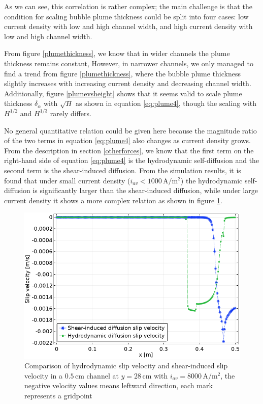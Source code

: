 As we can see, this correlation is rather complex; the main challenge is that the condition for scaling bubble plume thickness could be split into four cases: low current density with low and high channel width, and high current density with low and high channel width. 

From figure \ref{plumethickness}, we know that in wider channels the plume thickness remains constant, However, in narrower channels, we only managed to find a trend from figure \ref{plumethickness}, where the bubble plume thickness slightly increases with increasing current density and decreasing channel width. Additionally, figure \ref{plumevsheight} shows that it seems valid to scale plume thickness $\delta_{\alpha}$ with $\sqrt{H}$ as shown in equation \ref{eq:plume4}, though the scaling with $H^{1/2}$ and $H^{1/3}$ rarely differs. 

No general quantitative relation could be given here because the magnitude ratio of the two terms in equation \ref{eq:plume4} also changes as current density grows. From the description in section \ref{otherforces}, we know that the first term on the right-hand side of equation \ref{eq:plume4} is the hydrodynamic self-diffusion and the second term is the shear-induced diffusion. From the simulation results, it is found that under small current density ($i_{av} < 1000 \, \mathrm{A/m^2}$) the hydrodynamic self-diffusion is significantly larger than the shear-induced diffusion, while under large current density it shows a more complex relation as shown in figure \ref{slipcomparison}.

  \begin{figure}[H]
     \centering
     \includegraphics[scale = 0.7]{slipcomparison8000A5mm1.png}
     \caption{Comparison of hydrodynamic slip velocity and shear-induced slip velocity in a $\mathrm{0.5 \, cm}$ channel at $y = 28 \, \mathrm{cm}$ with $i_{av}=8000\, \mathrm{A/m^2}$, the negative velocity values means leftward direction, each mark represents a gridpoint}
     \label{slipcomparison}
 \end{figure}

